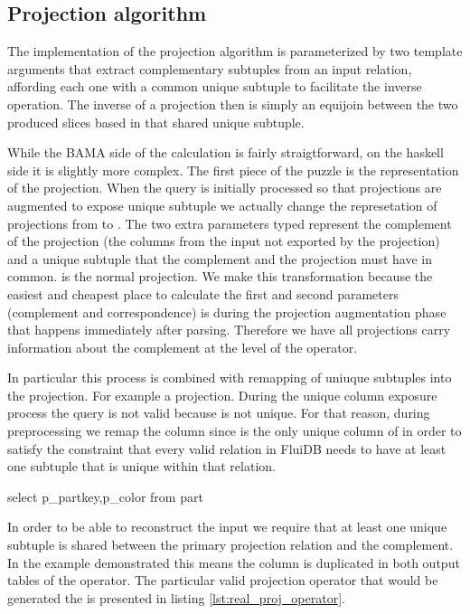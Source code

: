 \subsection{Projection algorithm}
\label{sec:projection_algorithm}

The implementation of the projection algorithm is parameterized by two
template arguments that extract complementary subtuples from an input
relation, affording each one with a common unique subtuple to
facilitate the inverse operation. The inverse of a projection then is
simply an equijoin between the two produced slices based in that
shared unique subtuple.

While the BAMA side of the calculation is fairly straigtforward, on
the haskell side it is slightly more complex. The first piece of the
puzzle is the representation of the projection. When the query is
initially processed so that projections are augmented to expose unique
subtuple we actually change the represetation of projections from
 to . The
two extra parameters typed \hask{[e]} represent the complement of the
projection (the columns from the input not exported by the projection)
and a unique subtuple that the complement and the projection must have
in common. \hask{[(e,Expr e)]} is the normal projection. We make this
transformation because the easiest and cheapest place to calculate the
first and second parameters (complement and correspondence) is during
the projection augmentation phase that happens immediately after
parsing. Therefore we have all projections carry information about the
complement at the level of the operator.

In particular this process is combined with remapping of uniuque
subtuples into the projection. For example a projection. During the
unique column exposure process the query  is not valid because  is not unique. For that
reason, during preprocessing we remap the  column
since  is the only unique column of 
in order to satisfy the constraint that every valid relation in FluiDB
needs to have at least one subtuple that is unique within that
relation.

\begin{sqlcode}
select p_partkey,p_color from part
\end{sqlcode}

In order to be able to reconstruct the input we require that at least
one unique subtuple is shared between the primary projection relation
and the complement. In the example demonstrated this means the
 column is duplicated in both output tables of the
operator. The particular valid projection operator that would be
generated the  is presented in listing
\ref{lst:real_proj_operator}.

